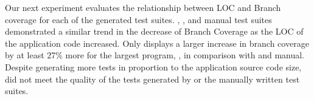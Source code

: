 
Our next experiment evaluates the relationship between LOC and Branch coverage for each of the generated test suites.  \evo, \codepro, and manual test suites demonstrated a similar trend in the decrease of Branch Coverage as the LOC of the application code increased. Only \codepro displays a larger increase in branch coverage by at least 27\%  more for the largest program, \netweaver, in comparison with  \evo and manual. Despite generating more tests in proportion to the application source code size,  \codepro did not meet the quality of the tests generated by \evo or the manually written test suites.

